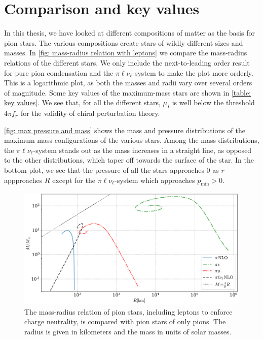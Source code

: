 \section{Comparison and key values}


In this thesis, we have looked at different compositions of matter as the basis for pion stars.
The various compositions create stars of wildly different sizes and masses.
In \autoref{fig: mass-radius relation with leptons} we compare the mass-radius relations of the different stars.
We only include the next-to-leading order result for pure pion condensation and the $\pi \ell \nu_\ell$-system to make the plot more orderly.
This is a logarithmic plot, as both the masses and radii vary over several orders of magnitude.
Some key values of the maximum-mass stars are shown in \autoref{table: key values}.
We see that, for all the different stars, $\mu_I$ is well below the threshold $4\pi f_\pi$ for the validity of chiral perturbation theory.

\autoref{fig: max pressure and mass} shows the mass and pressure distributions of the maximum mass configurations of the various stars.
Among the mass distributions, the $\pi\ell\nu_\ell$-system stands out as the mass increases in a straight line, as opposed to the other distributions, which taper off towards the surface of the star.
In the bottom plot, we see that the pressure of all the stars approaches $0$ as $r$ appproaches $R$ except for the $\pi\ell\nu_\ell$-system which approaches $p_\text{min}>0$.


\begin{figure}[!htb]
    \centering
    \includegraphics[width=.95\textwidth]{../scripts/figurer/pion_star/mass_radius_all.pdf}
    \caption{
        The mass-radius relation of pion stars, including leptons to enforce charge neutrality, is compared with pion stars of only pions.
        The radius is given in kilometers and the mass in units of solar masses.
        }
        \label{fig: mass-radius relation with leptons}
\end{figure}


